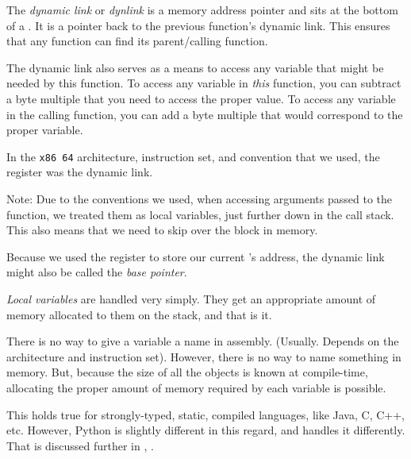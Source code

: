 \begin{definition}\label{def:Dynamic_Link}
  The \emph{dynamic link} or \emph{dynlink} is a memory address pointer and sits at the bottom of a .
  It is a pointer back to the previous function's dynamic link.
  This ensures that any function can find its parent/calling function.

  The dynamic link also serves as a means to access any variable that might be needed by this function.
  To access any variable in \emph{this} function, you can subtract a byte multiple that you need to access the proper value.
  To access any variable in the calling function, you can add a byte multiple that would correspond to the proper variable.

    In the \texttt{x86\textunderscore{} 64} architecture, instruction set, and convention that we used, the register \rbp{} was the dynamic link.
  \begin{remark}
    Note: Due to the conventions we used, when accessing arguments passed to the function, we treated them as local variables, just further down in the call stack.
    This also means that we need to skip over the  block in memory.
  \end{remark}
  
  \begin{remark}
    Because we used the \rbp{} register to store our current 's address, the dynamic link might also be called the \emph{base pointer}.
  \end{remark}
\end{definition}

\begin{definition}\label{def:Local_Variable}
  \emph{Local variables} are handled very simply.
  They get an appropriate amount of memory allocated to them on the stack, and that is it.

  There is no way to give a variable a name in assembly. (Usually. Depends on the architecture and instruction set).
  However, there is no way to name something in memory.
  But, because the size of all the objects is known at compile-time, allocating the proper amount of memory required by each variable is possible.

  \begin{remark}
    This holds true for strongly-typed, static, compiled languages, like Java, C, C++, etc.
    However, Python is slightly different in this regard, and handles it differently.
    That is discussed further in , .
  \end{remark}
\end{definition}


